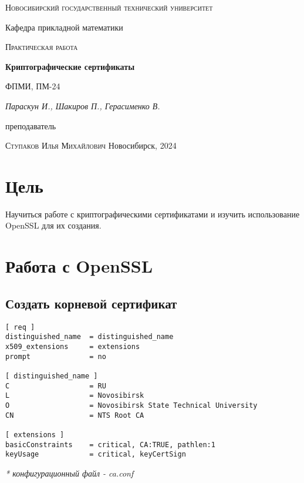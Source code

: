 \documentclass[12pt, a4paper]{article}
\begin{document}
\begin{titlepage}
  \centering
  \textsc{Новосибирский государственный технический университет}\par
  \vspace{1mm}
  Кафедра прикладной математики\par
  \vspace{4cm}
  \textsc{Практическая работа }\par
  {\huge\bfseries Криптографические сертификаты\par}
  \vspace{1cm}
  {\scriptsize ФПМИ, ПМ-24\par}
  \vspace{1mm}
  {\itshape\large Параскун И., Шакиров П., Герасименко В.\par}
  \vfill
  {\small преподаватель\par}
  \vspace{1mm}
  \textsc{Ступаков Илья Михайлович}
  \vfill
  \large{Новосибирск, 2024}
\end{titlepage}

\newpage

\section{Цель}
Научиться работе с криптографическими сертификатами и изучить использование OpenSSL для их создания.

\section{Работа с OpenSSL}
\subsection{Создать корневой сертификат}

\begin{verbatim}
[ req ]
distinguished_name  = distinguished_name
x509_extensions     = extensions
prompt              = no

[ distinguished_name ]
C                   = RU
L                   = Novosibirsk
O                   = Novosibirsk State Technical University
CN                  = NTS Root CA

[ extensions ]
basicConstraints    = critical, CA:TRUE, pathlen:1
keyUsage            = critical, keyCertSign
\end{verbatim}
\textit{* конфигурационный файл - ca.conf}
\end{document}
